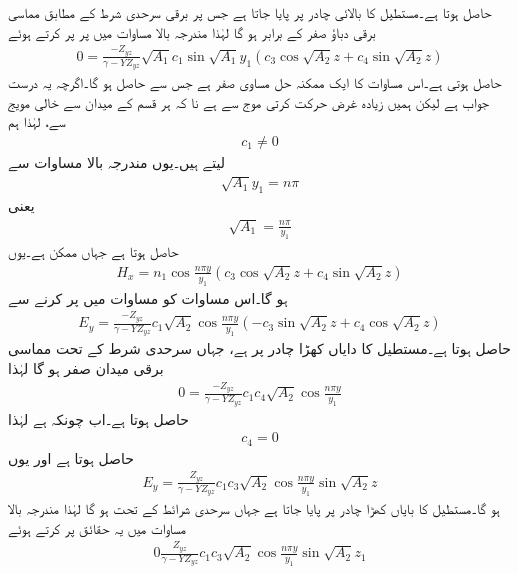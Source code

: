 حاصل ہوتا ہے۔مستطیل کا بالائی چادر  پر پایا جاتا ہے جس پر برقی سرحدی شرط کے مطابق مماسی  برقی دباؤ صفر کے برابر ہو گا لہٰذا مندرجہ بالا مساوات میں  پر  پر کرتے ہوئے
\begin{align*}
0=\frac{-Z_{yz}}{\gamma-Y Z_{yz}} \sqrt{A_1}c_1 \sin \sqrt{A_1} y_1 \left(c_3 \cos \sqrt{A_2} z + c_4 \sin \sqrt{A_2} z\right)
\end{align*}
حاصل ہوتی ہے۔اس مساوات کا ایک ممکنہ حل  مساوی صفر ہے جس سے  حاصل ہو گا۔اگرچہ یہ درست جواب ہے لیکن ہمیں زیادہ غرض حرکت کرتی موج سے ہے نا کہ ہر قسم کے میدان سے خالی مویج سے، لہٰذا ہم 
\begin{align}
c_1 \ne 0
\end{align}
لیتے ہیں۔یوں مندرجہ بالا مساوات سے
\begin{align*}
\sqrt{A_1} y_1 = n \pi
\end{align*}
یعنی
\begin{align}\label{مساوات_مویج_عمومی_حل_پہلا_مستقل}
\sqrt{A_1}=\frac{n \pi}{y_1}
\end{align}
حاصل ہوتا ہے جہاں  ممکن ہے۔یوں
\begin{align}\label{مساوات_مویج_موج_حل_ٹ}
H_x=n_1 \cos \frac{n \pi y}{y_1} \left(c_3 \cos \sqrt{A_2} z + c_4 \sin \sqrt{A_2} z\right)
\end{align}
ہو گا۔اس مساوات کو مساوات  میں پر کرنے سے
\begin{align*}
E_y=\frac{-Z_{yz}}{\gamma-Y Z_{yz}}c_1 \sqrt{A_2}\cos \frac{n \pi y}{y_1} \left(-c_3 \sin \sqrt{A_2} z + c_4 \cos \sqrt{A_2} z\right)
\end{align*}
حاصل ہوتا ہے۔مستطیل کا دایاں کھڑا چادر  پر ہے، جہاں سرحدی شرط کے تحت مماسی برقی میدان صفر ہو گا لہٰذا
\begin{align*}
0=\frac{-Z_{yz}}{\gamma-Y Z_{yz}}c_1 c_4 \sqrt{A_2}\cos \frac{n \pi y}{y_1}  
\end{align*}
حاصل ہوتا ہے۔اب چونکہ  ہے لہٰذا
\begin{align}
c_4=0
\end{align}
حاصل ہوتا ہے اور یوں
\begin{align*}
E_y=\frac{Z_{yz}}{\gamma-Y Z_{yz}}c_1 c_3 \sqrt{A_2}\cos \frac{n \pi y}{y_1} \sin \sqrt{A_2} z
\end{align*}
ہو گا۔مستطیل کا بایاں کھڑا چادر  پر پایا جاتا ہے جہاں سرحدی شرائط کے تحت  ہو گا لہٰذا مندرجہ بالا مساوات میں یہ حقائق پر کرتے ہوئے
\begin{align*}
0\frac{Z_{yz}}{\gamma-Y Z_{yz}}c_1 c_3 \sqrt{A_2}\cos \frac{n \pi y}{y_1} \sin \sqrt{A_2} z_1
\end{align*}
